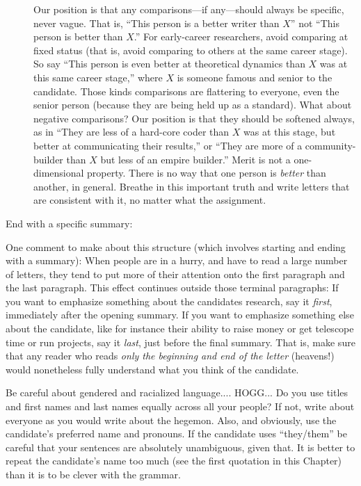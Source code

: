 \documentclass[letterpaper]{book}
\begin{document}
\begin{description}
    Our position is that any comparisons---if any---should always be specific, never vague.
    That is, ``This person is a better writer than $X$'' not ``This person is better than $X$.''
    For early-career researchers, avoid comparing at fixed status (that is, avoid comparing to others at the same career stage).
    So say ``This person is even better at theoretical dynamics than $X$ was at this same career stage,'' where $X$ is someone famous and senior to the candidate.
    Those kinds comparisons are flattering to everyone, even the senior person (because they are being held up as a standard).
    What about negative comparisons?
    Our position is that they should be softened always, as in
    ``They are less of a hard-core coder than $X$ was at this stage, but better at communicating their results,'' or
    ``They are more of a community-builder than $X$ but less of an empire builder.''
    Merit is not a one-dimensional property. There is no way that one person is \emph{better} than another, in general.
    Breathe in this important truth and write letters that are consistent with it, no matter what the assignment.
    \item[End with a specific summary:]
\end{description}
One comment to make about this structure (which involves starting and ending with a summary):
When people are in a hurry, and have to read a large number of letters, they tend to put more of their attention onto the first paragraph and the last paragraph.
This effect continues outside those terminal paragraphs:
If you want to emphasize something about the candidates research, say it \emph{first}, immediately after the opening summary.
If you want to emphasize something else about the candidate, like for instance their ability to raise money or get telescope time or run projects, say it \emph{last}, just before the final summary.
That is, make sure that any reader who reads \emph{only the beginning and end of the letter} (heavens!) would nonetheless fully understand what you think of the candidate.

Be careful about gendered and racialized language.... HOGG... Do you use titles and first names and last names equally across all your people?
If not, write about everyone as you would write about the hegemon.
Also, and obviously, use the candidate's preferred name and pronouns.
If the candidate uses ``they/them'' be careful that your sentences are absolutely unambiguous, given that.
It is better to repeat the candidate's name too much (see the first quotation in this Chapter) than it is to be clever with the grammar.
\end{document}
